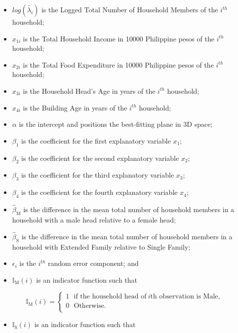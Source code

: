 \documentclass[
]{article}
\providecommand{\tightlist}{%
  \setlength{\itemsep}{0pt}\setlength{\parskip}{0pt}}
\begin{document}
\begin{itemize}
\tightlist
\item
  \(log(\tilde{\lambda_i})\) is the Logged Total Number of Household
  Members of the \(i^{th}\) household;
\item
  \(x_{1i}\) is the Total Household Income in 10000 Philippine pesos of
  the \(i^{th}\) household;
\item
  \(x_{2i}\) is the Total Food Expenditure in 10000 Philippine pesos of
  the \(i^{th}\) household;
\item
  \(x_{3i}\) is the Household Head's Age in years of the \(i^{th}\)
  household;
\item
  \(x_{4i}\) is the Building Age in years of the \(i^{th}\) household;
\item
  \(\alpha\) is the intercept and positions the best-fitting plane in 3D
  space;
\item
  \(\beta_1\) is the coefficient for the first explanatory variable
  \(x_1\);
\item
  \(\beta_2\) is the coefficient for the second explanatory variable
  \(x_2\);
\item
  \(\beta_3\) is the coefficient for the third explanatory variable
  \(x_3\);
\item
  \(\beta_4\) is the coefficient for the fourth explanatory variable
  \(x_4\);
\item
  \(\widehat{\beta}_{\mbox{M}}\) is the difference in the mean total
  number of household members in a household with a male head relative
  to a female head;
\item
  \(\widehat{\beta}_{\mbox{S}}\) is the difference in the mean total
  number of household members in a household with Extended Family
  relative to Single Family;
\item
  \(\epsilon_i\) is the \(i^{th}\) random error component; and
\item
  \(\mathbb{I}_{\mbox{M}}(i)\) is an indicator function such that
\end{itemize}

\[\mathbb{I}_{\mbox{M}}(i)=\left\{
\begin{array}{ll}
1 ~~~ \mbox{if the household head of} ~ i \mbox{th observation is Male},\\
0 ~~~ \mbox{Otherwise}.\\
\end{array}
\right.\]

\begin{itemize}
\tightlist
\item
  \(\mathbb{I}_{\mbox{S}}(i)\) is an indicator function such that
\end{itemize}
\end{document}
